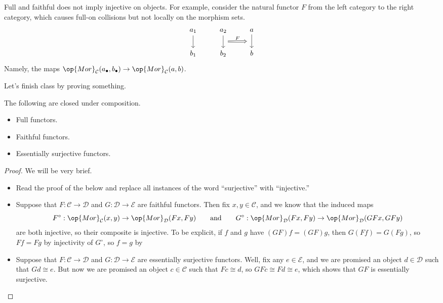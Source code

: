 \documentclass[../notes.tex]{subfiles}
\begin{document}
\begin{example}
	Full and faithful does not imply injective on objects. For example, consider the natural functor $F$ from the left category to the right category, which causes full-on collisions but not locally on the morphism sets.
	\[\begin{tikzcd}
		{a_1} & {a_2} & a \\
		{b_1} & {b_2} & b
		\arrow[from=1-1, to=2-1]
		\arrow[""{name=0, anchor=center, inner sep=0}, from=1-2, to=2-2]
		\arrow[""{name=1, anchor=center, inner sep=0}, from=1-3, to=2-3]
		\arrow["F", shorten <=6pt, shorten >=6pt, Rightarrow, from=0, to=1]
	\end{tikzcd}\]
	Namely, the maps $\op{Mor}_\mathcal C(a_\bullet,b_\bullet)\to\op{Mor}_\mathcal C(a,b)$.
\end{example}
Let's finish class by proving something.
\begin{prop}
	The following are closed under composition.
	\begin{itemize}
		\item Full functors.
		\item Faithful functors.
		\item Essentially surjective functors.
	\end{itemize}
\end{prop}
\begin{proof}
	We will be very brief.
	\begin{itemize}
		\item Read the proof of the below and replace all instances of the word ``surjective'' with ``injective.''
		\item Suppose that $F:\mathcal C\to\mathcal D$ and $G:\mathcal D\to\mathcal E$ are faithful functors. Then fix $x,y\in\mathcal C$, and we know that the induced maps
		\[F^\circ:\op{Mor}_\mathcal C(x,y)\to\op{Mor}_\mathcal D(Fx,Fy)\qquad\text{and}\qquad G^\circ:\op{Mor}_\mathcal D(Fx,Fy)\to\op{Mor}_\mathcal D(GFx,GFy)\]
		are both injective, so their composite is injective. To be explicit, if $f$ and $g$ have $(GF)f=(GF)g$, then $G(Ff)=G(Fg)$, so $Ff=Fg$ by injectivity of $G^\circ$, so $f=g$ by 
		\item Suppose that $F:\mathcal C\to\mathcal D$ and $G:\mathcal D\to\mathcal E$ are essentially surjective functors. Well, fix any $e\in\mathcal E$, and we are promised an object $d\in\mathcal D$ such that $Gd\cong e$. But now we are promised an object $c\in\mathcal C$ such that $Fc\cong d$, so $GFc\cong Fd\cong e$, which shows that $GF$ is essentially surjective.
		\qedhere
	\end{itemize}
\end{proof}
\end{document}

